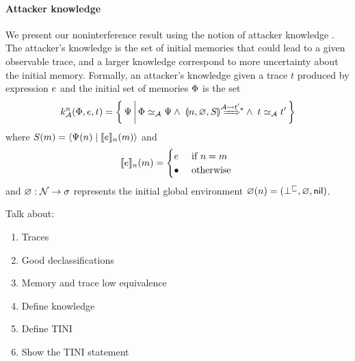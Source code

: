 \paragraph{Attacker knowledge}
We present our noninterference result using the notion of attacker knowledge \cite{A bunch of Aslan's papers}. The attacker's knowledge is the set of initial memories that could lead to a given observable trace, and a larger knowledge correspond to more uncertainty about the initial memory. Formally, an attacker's knowledge given a trace $t$ produced by expression $e$ and the initial set of memories $\Phi$ is the set
\begin{equation*}
k^n_{\Attacker}(\globalstore, \expr, t) = \left\{ \, \altglobalstore \, \middle\vert \, \globalstore \simeq_{\Attacker} \altglobalstore \wedge \; \gconfig{n}{\emptyenv}{S} \gstepstos[][\Attacker \filtertrace t'] \wedge \; t \simeq_{\Attacker} t' \, \right\}
\end{equation*}
where $S(m) = \langle \Psi(n) \mid \llbracket e \rrbracket_n(m) \rangle$ and
\begin{equation*}
\llbracket e \rrbracket_n(m) =
\begin{cases}
e & \text{ if } n = m\\
\bullet & \text{ otherwise }
\end{cases}
\end{equation*}
and $\varnothing: \mathcal{N} \to \sigma$ represents the initial global environment $\varnothing(n) = (\bot^{\sqsubseteq}, \varnothing, \mathsf{nil})$.


Talk about:
\begin{enumerate}
    \item Traces
    \item Good declassifications
    \item Memory and trace low equivalence
    \item Define knowledge
    \item Define TINI
    \item Show the TINI statement
\end{enumerate}
